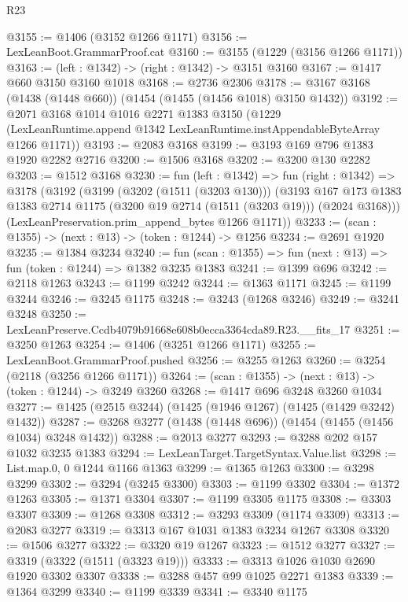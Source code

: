 \begin{lexlean}{R23}
\begin{coremodule}
@3155 := @1406 (@3152 @1266 @1171)
@3156 := LexLeanBoot.GrammarProof.cat
@3160 := @3155 (@1229 (@3156 @1266 @1171))
@3163 := (left : @1342) -> (right : @1342) -> @3151 @3160
@3167 := @1417 @660 @3150 @3160 @1018
@3168 := @2736 @2306
@3178 := @3167 @3168 (@1438 (@1448 @660)) (@1454 (@1455 (@1456 @1018) @3150 @1432))
@3192 := @2071
    @3168
    @1014
    @1016
    @2271
    @1383
    @3150
    (@1229 (LexLeanRuntime.append @1342 LexLeanRuntime.instAppendableByteArray @1266 @1171))
@3193 := @2083 @3168
@3199 := @3193 @169 @796 @1383 @1920 @2282 @2716
@3200 := @1506 @3168
@3202 := @3200 @130 @2282
@3203 := @1512 @3168
@3230 := fun (left : @1342) =>
  fun (right : @1342) =>
  @3178
    (@3192
      (@3199
        (@3202 (@1511 (@3203 @130)))
        (@3193
          @167
          @173
          @1383
          @1383
          @2714
          @1175
          (@3200 @19 @2714 (@1511 (@3203 @19)))
          (@2024 @3168)))
      (LexLeanPreservation.prim_append_bytes @1266 @1171))
@3233 := (scan : @1355) -> (next : @13) -> (token : @1244) -> @1256
@3234 := @2691 @1920
@3235 := @1384 @3234
@3240 := fun (scan : @1355) => fun (next : @13) => fun (token : @1244) => @1382 @3235 @1383
@3241 := @1399 @696
@3242 := @2118 @1263
@3243 := @1199 @3242
@3244 := @1363 @1171
@3245 := @1199 @3244
@3246 := @3245 @1175
@3248 := @3243 (@1268 @3246)
@3249 := @3241 @3248
@3250 := LexLeanPreserve.Ccdb4079b91668e608b0ecca3364cda89.R23.__fits_17
@3251 := @3250 @1263
@3254 := @1406 (@3251 @1266 @1171)
@3255 := LexLeanBoot.GrammarProof.pushed
@3256 := @3255 @1263
@3260 := @3254 (@2118 (@3256 @1266 @1171))
@3264 := (scan : @1355) -> (next : @13) -> (token : @1244) -> @3249 @3260
@3268 := @1417 @696 @3248 @3260 @1034
@3277 := @1425 (@2515 @3244) (@1425 (@1946 @1267) (@1425 (@1429 @3242) @1432))
@3287 := @3268 @3277 (@1438 (@1448 @696)) (@1454 (@1455 (@1456 @1034) @3248 @1432))
@3288 := @2013 @3277
@3293 := @3288 @202 @157 @1032 @3235 @1383
@3294 := LexLeanTarget.TargetSyntax.Value.list
@3298 := List.map.{0, 0} @1244 @1166 @1363
@3299 := @1365 @1263
@3300 := @3298 @3299
@3302 := @3294 (@3245 @3300)
@3303 := @1199 @3302
@3304 := @1372 @1263
@3305 := @1371 @3304
@3307 := @1199 @3305 @1175
@3308 := @3303 @3307
@3309 := @1268 @3308
@3312 := @3293 @3309 (@1174 @3309)
@3313 := @2083 @3277
@3319 := @3313 @167 @1031 @1383 @3234 @1267 @3308
@3320 := @1506 @3277
@3322 := @3320 @19 @1267
@3323 := @1512 @3277
@3327 := @3319 (@3322 (@1511 (@3323 @19)))
@3333 := @3313 @1026 @1030 @2690 @1920 @3302 @3307
@3338 := @3288 @457 @99 @1025 @2271 @1383
@3339 := @1364 @3299
@3340 := @1199 @3339
@3341 := @3340 @1175

\end{coremodule}
\end{lexlean}
